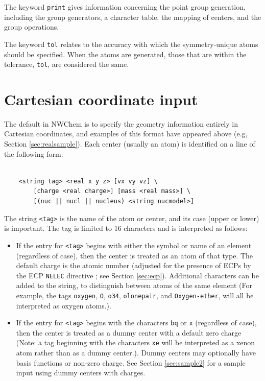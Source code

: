 The keyword \verb+print+ gives information concerning the point group
generation, including the group generators, a character table, the
mapping of centers, and the group operations.

The keyword \verb+tol+ relates to the accuracy with which the symmetry-unique
atoms should be specified.  When the atoms are generated, those that are
within the tolerance, \verb+tol+, are considered the same.

\section{Cartesian coordinate input}
\label{sec:cart}

The default in NWChem is to specify the geometry information entirely
in Cartesian coordinates, and examples of this format have 
appeared above (e.g, Section \ref{sec:realsample}). Each center
(usually an atom) is identified on a line of the following form:
\begin{verbatim}

    <string tag> <real x y z> [vx vy vz] \
        [charge <real charge>] [mass <real mass>] \
        [(nuc || nucl || nucleus) <string nucmodel>]

\end{verbatim}

The string \verb+<tag>+ is the name of the atom or center, and its case
(upper or lower) is important.  The tag is limited to 16 characters
and is interpreted as follows:
\begin{itemize}
\item If the entry for \verb+<tag>+ begins with either the symbol or
  name of an element (regardless of case), then the center is treated
  as an atom of that type.  The default charge is the atomic number
  (adjusted for the presence of ECPs by the ECP \verb+NELEC+ directive
  ; see Section \ref{sec:ecp}).  Additional characters can be added to
  the string, to distinguish between atoms of the same element (For
  example, the tags \verb+oxygen+, \verb+O+, \verb+o34+,
  \verb+olonepair+, and \verb+Oxygen-ether+, will all be interpreted
  as oxygen atoms.).
\item If the entry for \verb+<tag>+ begins with the characters
  \verb+bq+ or \verb+x+ (regardless of case), then the center is
  treated as a dummy center with a default zero charge (Note: a tag
  beginning with the characters \verb+xe+ will be interpreted as a
  xenon atom rather than as a dummy center.).  Dummy centers may
  optionally have basis functions or non-zero charge.  See Section
  \ref{sec:sample2} for a sample input using dummy centers with
  charges.
\end{itemize}

